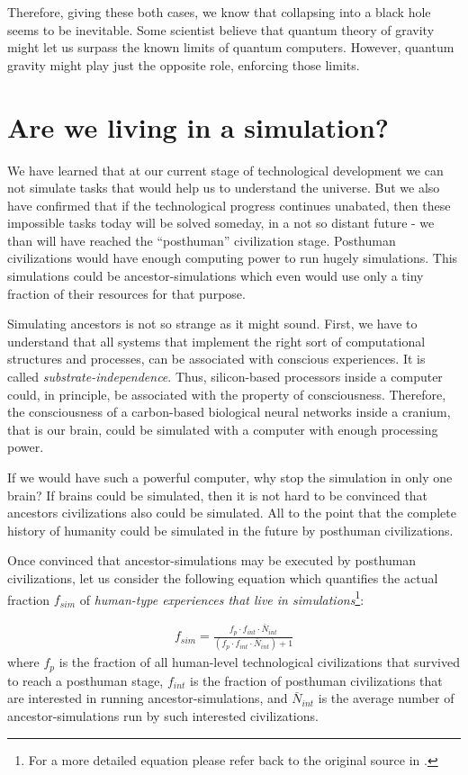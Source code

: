 \documentclass[twoside,11pt]{article}
\begin{document}
Therefore, giving these both cases, we know that collapsing into a black hole seems to be inevitable.
Some scientist believe that quantum theory of gravity might let us surpass the known limits of quantum computers.
However, quantum gravity might play just the opposite role, enforcing those limits.
 
\section{Are we living in a simulation?}
\label{sec:sim}

We have learned that at our current stage of technological development we can not simulate tasks that would help us to understand the universe.
But we also have confirmed that if the technological progress continues unabated, then these impossible tasks today will be solved someday, in a not so distant future - we than will have reached the ``posthuman'' civilization stage.
Posthuman civilizations would have enough computing power to run hugely simulations.
This simulations could be ancestor-simulations which even would use only a tiny fraction of their resources for that purpose.

Simulating ancestors is not so strange as it might sound.
First, we have to understand that all systems that implement the right sort of computational structures and processes, can be associated with conscious experiences.
It is called \emph{substrate-independence}.
Thus, silicon-based processors inside a computer could, in principle, be associated with the property of consciousness.
Therefore, the consciousness of a carbon-based biological neural networks inside a cranium, that is our brain, could be simulated with a computer with enough processing power.

If we would have such a powerful computer, why stop the simulation in only one brain?
If brains could be simulated, then it is not hard to be convinced that ancestors civilizations also could be simulated.
All to the point that the complete history of humanity could be simulated in the future by posthuman civilizations.

Once convinced that ancestor-simulations may be executed by posthuman civilizations, let us consider the following equation which quantifies the actual fraction $f_{sim}$ of \emph{human-type experiences that live in simulations}\footnote{For a more detailed equation please refer back to the original source in \citep{bostrom2003we}.}:

\begin{eqnarray*}
	f_{sim} = \frac{f_p \cdot f_{int} \cdot \bar{N}_{int}}{(f_p \cdot f_{int} \cdot \bar{N}_{int}) + 1}
\end{eqnarray*}
where 
$f_p$ is the fraction of all human-level technological civilizations that survived to reach a posthuman stage,
$f_{int}$ is the fraction of posthuman civilizations that are interested in running ancestor-simulations, and
$\bar{N}_{int}$ is the average number of ancestor-simulations run by such interested civilizations.
\end{document}
